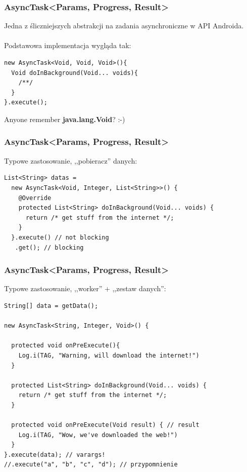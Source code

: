 \documentclass{beamer}
\begin{document}
\begin{frame}[fragile]\frametitle{AsyncTask<Params, Progress, Result>}
Jedna z śliczniejszych abstrakcji na zadania asynchroniczne w API Androida.\\
\ \\
Podstawowa implementacja wygląda tak:

\begin{lstlisting}
new AsyncTask<Void, Void, Void>(){
  Void doInBackground(Void... voids){
    /**/
  }
}.execute();
\end{lstlisting}

\pause

Anyone remember \textbf{java.lang.Void}? :-)

\end{frame}


\begin{frame}[fragile]\frametitle{AsyncTask<Params, Progress, Result>}
Typowe zastosowanie, ,,pobieracz'' danych:
\begin{lstlisting}
List<String> datas = 
  new AsyncTask<Void, Integer, List<String>>() {
    @Override
    protected List<String> doInBackground(Void... voids) {
      return /* get stuff from the internet */;
    }
  }.execute() // not blocking
   .get(); // blocking
\end{lstlisting}
\end{frame}

\begin{frame}[fragile]\frametitle{AsyncTask<Params, Progress, Result>}
Typowe zastosowanie, ,,worker'' + ,,zestaw danych'':
\begin{lstlisting}
String[] data = getData();

new AsyncTask<String, Integer, Void>() {

  protected void onPreExecute(){
    Log.i(TAG, "Warning, will download the internet!")
  }

  protected List<String> doInBackground(Void... voids) {
    return /* get stuff from the internet */;
  }

  protected void onPreExecute(Void result) { // result
    Log.i(TAG, "Wow, we've downloaded the web!")
  }
}.execute(data); // varargs!
//.execute("a", "b", "c", "d"); // przypomnienie
\end{lstlisting}
\end{frame}
\end{document}
